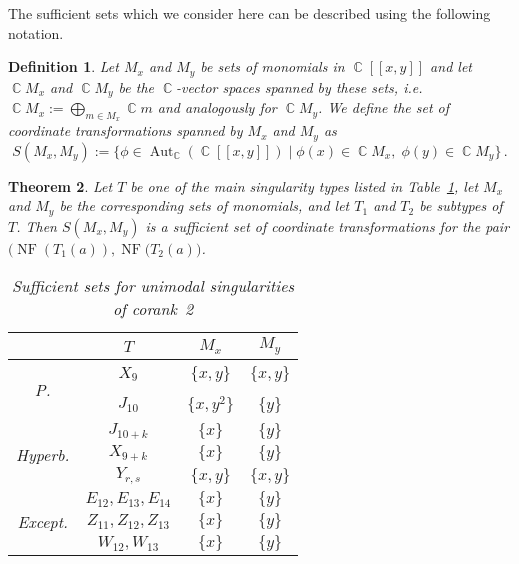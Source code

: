 \documentclass[noend]{amsproc}
\newtheorem{theorem}{Theorem}
\newtheorem{defn}[theorem]{Definition}
\theoremstyle{definition}
\DeclareMathOperator{\C}{\mathbb{C}}
\DeclareMathOperator{\NF}{NF}
\DeclareMathOperator{\Aut}{Aut}
\begin{document}
The sufficient sets which we consider here can be described using the
following notation.

\begin{defn}
Let $M_x$ and $M_y$ be sets of monomials in $\C[[x,y]]$ and let $\C\! M_x$ and
$\C\! M_y$ be the $\C$-vector spaces spanned by these sets, i.e.\@
$\C\! M_x := \bigoplus_{m \in M_x} \C m$ and analogously for $\C\! M_y$. We
define the set of coordinate transformations spanned by $M_x$ and $M_y$ as
\[
S(M_x, M_y) := \{ \phi \in \Aut_{\C}(\C[[x,y]]) \mid
\phi(x) \in \C\! M_x,\; \phi(y) \in \C\! M_y \} \,.
\]
\end{defn}

\begin{theorem}\label{thm:sufficient_sets}
Let $T$ be one of the main singularity types listed in
Table~\ref{tab:sufficient_sets}, let $M_x$ and $M_y$ be the corresponding sets
of monomials, and let $T_1$ and $T_2$ be subtypes of $T$. Then $S(M_x, M_y)$
is a sufficient set of coordinate transformations for the pair
$\bigl(\NF(T_1(a)), \NF(T_2(a)\bigr)$.

\begin{table}[htb]
\centering
\caption{Sufficient sets for unimodal singularities of corank~2}
\label{tab:sufficient_sets}
\begin{tabular}{|c|c|c|c|}
\hline

& $T$ & $M_x$ & $M_y$ \\
\hline\hline


\multirow{2}{*}{\begin{sideways}P.\end{sideways}}

& $X_9$    & $\{x, y\}$   & $\{x, y\}$ \\ \cline{2-4}
& $J_{10}$ & $\{x, y^2\}$ & $\{y\}$    \\ \hline


\multirow{3}{*}{\begin{sideways}Hyperb.\end{sideways}}

& $J_{10+k}$ & $\{x\}$    & $\{y\}$    \\ \cline{2-4}
& $X_{9+k}$  & $\{x\}$    & $\{y\}$    \\ \cline{2-4}
& $Y_{r,s}$  & $\{x, y\}$ & $\{x, y\}$ \\ \hline


\multirow{3}{*}{\begin{sideways}Except.\end{sideways}}

& $E_{12}, E_{13}, E_{14}$ & $\{x\}$ & $\{y\}$ \\ \cline{2-4}
& $Z_{11}, Z_{12}, Z_{13}$ & $\{x\}$ & $\{y\}$ \\ \cline{2-4}
& $W_{12}, W_{13}$         & $\{x\}$ & $\{y\}$ \\ \hline

\end{tabular}
\end{table}

\end{theorem}
\end{document}
